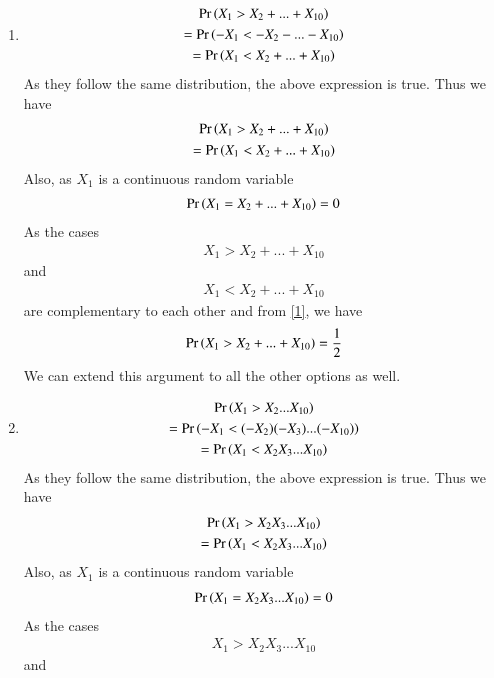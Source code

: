 \documentclass[journal,12pt,twocolumn]{IEEEtran}
\begin{document}
\begin{enumerate}[label = (\Alph*)]
    \item \begin{multline}
        \Pr\left(X_1>X_2+...+X_{10}\right)\\=\Pr\left(-X_1<-X_2-...-X_{10}\right)\\
        =\Pr\left(X_1<X_2+...+X_{10}\right)
    \end{multline}
    As they follow the same distribution, the above expression is true.
    Thus we have
    \begin{multline}\label{1}
    \Pr\left(X_1>X_2+...+X_{10}\right)\\
        =\Pr\left(X_1<X_2+...+X_{10}\right)    
    \end{multline}
    Also, as $X_1$ is a continuous random variable
    \begin{align}
       \Pr\left(X_1=X_2+...+X_{10}\right)=0
    \end{align}
     As the cases
     \begin{align}
      {X_1>X_2+...+X_{10}}   
     \end{align}and 
     \begin{align}
         {X_1<X_2+...+X_{10}}
     \end{align}are complementary to each other and from \eqref{1}, we have 
        \begin{align}
         \Pr\left(X_1>X_2+...+X_{10}\right)=\frac{1}{2}   
        \end{align}
        We can extend this argument to all the other options as well.
\item
\begin{multline}
        \Pr\left(X_1>X_2...X_{10}\right)\\=\Pr\left(-X_1<(-X_2)(-X_3)...(-X_{10})\right)\\
        =\Pr\left(X_1<X_2X_3...X_{10}\right)
    \end{multline}
    As they follow the same distribution, the above expression is true.
    Thus we have
    \begin{multline}\label{1}
    \Pr\left(X_1>X_2X_3...X_{10}\right)\\
        =\Pr\left(X_1<X_2X_3...X_{10}\right)    
    \end{multline}
    Also, as $X_1$ is a continuous random variable
    \begin{align}
       \Pr\left(X_1=X_2X_3...X_{10}\right)=0
    \end{align}
     As the cases
     \begin{align}
      {X_1>X_2X_3...X_{10}}   
     \end{align}and 
     \begin{align}

\end{align}
\end{enumerate}
\end{document}
